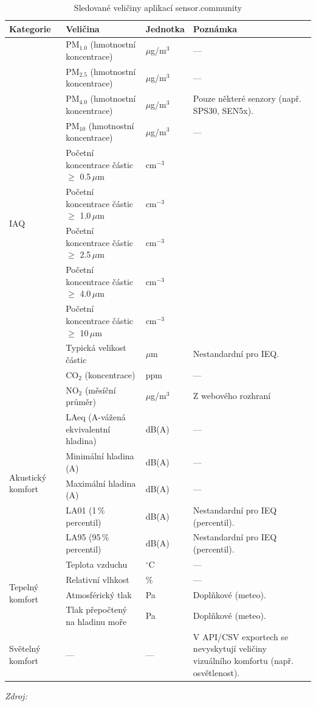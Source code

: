 \begin{table}[!tbp]
  \centering
  \footnotesize
  \setlength{\tabcolsep}{2pt}
  \renewcommand{\arraystretch}{1.1}
  \caption{Sledované veličiny aplikací sensor.community}
  \label{tab:sensor-community-veliciny}
  \begin{tabular}{p{2.8cm} p{5.8cm} p{1.7cm} >{\raggedright\arraybackslash}p{4.6cm}}
    \toprule
    \textbf{Kategorie} & \textbf{Veličina} & \textbf{Jednotka} & \textbf{Poznámka}\\
    \midrule
    \multirow{12}{*}{IAQ} & PM$_{1.0}$ (hmotnostní koncentrace) & $\mu$g/m$^3$ & ---\\
     & PM$_{2.5}$ (hmotnostní koncentrace) & $\mu$g/m$^3$ & ---\\
     & PM$_{4.0}$ (hmotnostní koncentrace) & $\mu$g/m$^3$ & Pouze některé senzory (např. SPS30, SEN5x).\\
     & PM$_{10}$ (hmotnostní koncentrace) & $\mu$g/m$^3$ & ---\\
     & Početní koncentrace částic $\geq$ 0.5\,$\mu$m & cm$^{-3}$ & \multirow{5}{4.6cm}{Nestandardní pro IEQ; početní (nikoli hmotnostní) metrika.}\\
     & Početní koncentrace částic $\geq$ 1.0\,$\mu$m & cm$^{-3}$ & \\
     & Početní koncentrace částic $\geq$ 2.5\,$\mu$m & cm$^{-3}$ & \\
     & Početní koncentrace částic $\geq$ 4.0\,$\mu$m & cm$^{-3}$ & \\
     & Početní koncentrace částic $\geq$ 10\,$\mu$m & cm$^{-3}$ & \\
     & Typická velikost částic & $\mu$m & Nestandardní pro IEQ.\\
     & CO$_2$ (koncentrace) & ppm & ---\\
     & NO$_2$ (měsíční průměr) & $\mu$g/m$^3$ & Z webového rozhraní\\
    \midrule
    \multirow{5}{*}{Akustický komfort} & LAeq (A-vážená ekvivalentní hladina) & dB(A) & ---\\
     & Minimální hladina (A) & dB(A) & ---\\
     & Maximální hladina (A) & dB(A) & ---\\
     & LA01 (1\,\% percentil) & dB(A) & Nestandardní pro IEQ (percentil).\\
     & LA95 (95\,\% percentil) & dB(A) & Nestandardní pro IEQ (percentil).\\
    \midrule
    \multirow{4}{*}{Tepelný komfort} & Teplota vzduchu & $^\circ$C & ---\\
     & Relativní vlhkost & \% & ---\\
     & Atmosférický tlak & Pa & Doplňkové (meteo).\\
     & Tlak přepočtený na hladinu moře & Pa & Doplňkové (meteo).\\
    \midrule
    \multirow{1}{*}{Světelný komfort} & --- & --- & V API/CSV exportech se nevyskytují veličiny vizuálního komfortu (např. osvětlenost).\\
    \bottomrule
  \end{tabular}

  \footnotesize \textit{Zdroj:} \parencite{Index, APIs}
\end{table}

